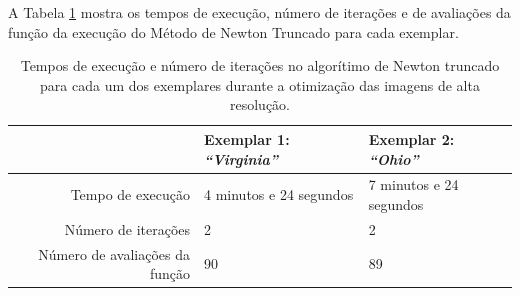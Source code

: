A Tabela \ref{tab:temposexec2} mostra os tempos de execução, número de iterações e de avaliações da função da execução do Método de Newton Truncado para cada exemplar.

\begin{table}[H]
	\caption{Tempos de execução e número de iterações no algorítimo de Newton truncado para cada um dos exemplares durante a otimização das imagens de alta resolução.}
	\label{tab:temposexec2}
	\begin{tabular}{r || l | l}
		 & Exemplar 1: \emph{``Virginia''} & Exemplar 2: \emph{``Ohio''} \\ \hline
		Tempo de execução & 4 minutos e 24 segundos & 7 minutos e 24 segundos\\ \hline
		Número de iterações & 2 & 2 \\ \hline
		Número de avaliações da função & 90 & 89
	\end{tabular}
\end{table}



